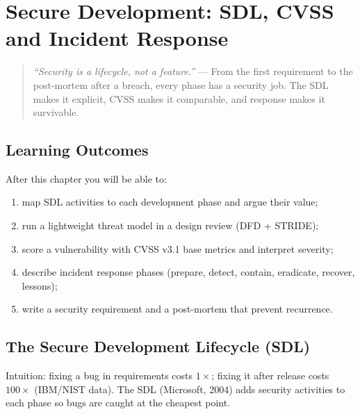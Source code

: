 \chapter{Secure Development: SDL, CVSS and Incident Response}
\label{ch:secure-dev}

\begin{quote}
\emph{``Security is a lifecycle, not a feature.''} --- From the first requirement to the post-mortem after a breach, every phase has a security job. The SDL makes it explicit, CVSS makes it comparable, and response makes it survivable.
\end{quote}

\noindent{}
\vspace{0.4em}

\section*{Learning Outcomes}
After this chapter you will be able to:
\begin{enumerate}[label=(L\arabic*)]
    \item map SDL activities to each development phase and argue their value;
    \item run a lightweight threat model in a design review (DFD + STRIDE);
    \item score a vulnerability with CVSS v3.1 base metrics and interpret severity;
    \item describe incident response phases (prepare, detect, contain, eradicate, recover, lessons);
    \item write a security requirement and a post-mortem that prevent recurrence.
\end{enumerate}

\section{The Secure Development Lifecycle (SDL)}
\label{sec:sdl}
Intuition: fixing a bug in requirements costs $1\times$; fixing it after release costs $100\times$ (IBM/NIST data). The SDL (Microsoft, 2004) adds security activities to each phase so bugs are caught at the cheapest point.

